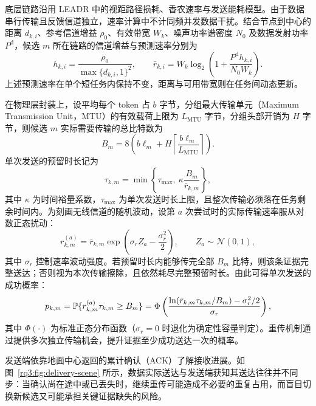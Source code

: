 底层链路沿用 LEADR 中的视距路径损耗、香农速率与发送能耗模型。由于数据串行传输且反馈信道独立，速率计算中不计同频并发数据干扰。结合节点到中心的距离 $d_{k,i}$、参考信道增益 $\rho_0$、有效带宽 $W_k$、噪声功率谱密度 $N_0$ 及数据发射功率 $P^{\mathrm d}$，候选 $m$ 所在链路的信道增益与预测速率分别为
\begin{equation}
  h_{k,i}=\frac{\rho_0}{\max\{d_{k,i},1\}^2},\qquad
  \bar r_{k,i}=W_k\log_2\left(1+\frac{P^{\mathrm d}h_{k,i}}{N_0W_k}\right).
  \label{rq3:eq:rate}
\end{equation}
上述预测速率在单个短任务内保持不变，距离与可用带宽则在任务间动态更新。

在物理层封装上，设平均每个 token 占 $b$ 字节，分组最大传输单元（Maximum Transmission Unit，MTU）的有效载荷上限为 $L_{\mathrm{MTU}}$ 字节，分组头部开销为 $H$ 字节，则候选 $m$ 实际需要传输的总比特数为
\begin{equation}
  B_m=8\left(b\ell_m+H\left\lceil\frac{b\ell_m}{L_{\mathrm{MTU}}}\right\rceil\right).
  \label{rq3:eq:bits}
\end{equation}
单次发送的预留时长记为
\begin{equation}
  \tau_{k,m}=\min\left\{\tau_{\max},\ \kappa\frac{B_m}{\bar r_{k,m}}\right\},
  \label{rq3:eq:duration}
\end{equation}
其中 $\kappa$ 为时间裕量系数，$\tau_{\max}$ 为单次发送时长上限，且整次传输必须落在任务剩余时间内。为刻画无线信道的随机波动，设第 $a$ 次尝试时的实际传输速率服从对数正态扰动：
\begin{equation}
  r_{k,m}^{(a)}=\bar r_{k,m}\exp\left(\sigma_r Z_a-\frac{\sigma_r^2}{2}\right),
  \qquad Z_a\sim\mathcal{N}(0,1),
  \label{rq3:eq:random-rate}
\end{equation}
其中 $\sigma_r$ 控制速率波动强度。若预留时长内能够传完全部 $B_m$ 比特，则该条证据完整送达；否则视为本次传输擦除，且依然耗尽完整预留时长。由此可得单次发送的成功概率：
\begin{equation}
  p_{k,m}=\mathbb{P}\{r_{k,m}^{(a)}\tau_{k,m}\ge B_m\}
  =\Phi\left(\frac{\ln(\bar r_{k,m}\tau_{k,m}/B_m)-\sigma_r^2/2}{\sigma_r}\right),
  \label{rq3:eq:success-probability}
\end{equation}
其中 $\Phi(\cdot)$ 为标准正态分布函数（$\sigma_r=0$ 时退化为确定性容量判定）。重传机制通过提供多次独立传输机会，提升证据至少成功送达一次的概率。

发送端依靠地面中心返回的累计确认（ACK）了解接收进展。如图~\ref{rq3:fig:delivery-scene} 所示，数据实际送达与发送端获知其送达往往并不同步：当确认尚在途中或已丢失时，继续重传可能造成不必要的重复占用，而盲目切换新候选又可能承担关键证据缺失的风险。

